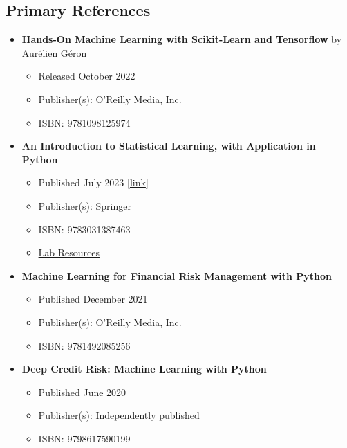 \documentclass[a4paper, 12pt]{article}
\begin{document}
\subsection{Primary References}
\begin{itemize}
    \item \textbf{Hands-On Machine Learning with Scikit-Learn and Tensorflow} by Aur\'elien G\'eron
    \begin{itemize}
        \item Released October 2022
        \item Publisher(s): O'Reilly Media, Inc.
        \item ISBN: 9781098125974
    \end{itemize}

    \item \textbf{An Introduction to Statistical Learning, with Application in Python}
    \begin{itemize}
        \item Published July 2023 [\href{www.statlearning.com}{link}]
        \item Publisher(s): Springer
        \item ISBN: 9783031387463
        \item \href{https://www.statlearning.com/resources-python}{Lab Resources}
    \end{itemize}

    \item \textbf{Machine Learning for Financial Risk Management with Python}
    \begin{itemize}
        \item Published December 2021
        \item Publisher(s): O'Reilly Media, Inc.
        \item ISBN: 9781492085256
    \end{itemize}

    \item \textbf{Deep Credit Risk: Machine Learning with Python}
    \begin{itemize}
        \item Published June 2020
        \item Publisher(s): Independently published
        \item ISBN: 9798617590199
    \end{itemize}
\end{itemize}
\end{document}
